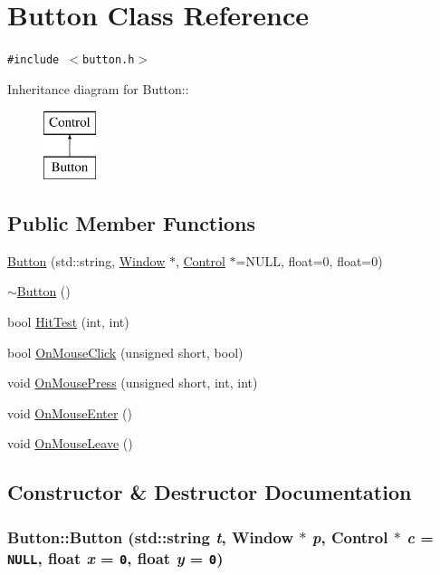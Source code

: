 \hypertarget{class_button}{
\section{Button Class Reference}
\label{class_button}
}
{\tt \#include $<$button.h$>$}

Inheritance diagram for Button::\begin{figure}[H]
\begin{center}
\leavevmode
\includegraphics[height=2cm]{class_button}
\end{center}
\end{figure}
\subsection*{Public Member Functions}
\begin{CompactItemize}
\item 
\hyperlink{class_button_17a0f84e3dfe2f184a8e686a7802b924}{Button} (std::string, \hyperlink{class_window}{Window} $\ast$, \hyperlink{class_control}{Control} $\ast$=NULL, float=0, float=0)
\item 
\hyperlink{class_button_2a001eb9c3cc8ae54768a850dd345002}{$\sim$Button} ()
\item 
bool \hyperlink{class_button_8de2fc8228ff5599b4aaf1ae3db0725f}{HitTest} (int, int)
\item 
bool \hyperlink{class_button_cad3e7ea82ecd98781863ae7ab082ce8}{OnMouseClick} (unsigned short, bool)
\item 
void \hyperlink{class_button_d6b93ae1c85c1dba05424becc7e051f7}{OnMousePress} (unsigned short, int, int)
\item 
void \hyperlink{class_button_69408b048737143eba5ab348e9208405}{OnMouseEnter} ()
\item 
void \hyperlink{class_button_e6593ca8bb94fe3c54a09bf5cf060cf2}{OnMouseLeave} ()
\end{CompactItemize}


\subsection{Constructor \& Destructor Documentation}
\hypertarget{class_button_17a0f84e3dfe2f184a8e686a7802b924}{
\subsubsection[{Button}]{\setlength{\rightskip}{0pt plus 5cm}Button::Button (std::string {\em t}, \/  {\bf Window} $\ast$ {\em p}, \/  {\bf Control} $\ast$ {\em c} = {\tt NULL}, \/  float {\em x} = {\tt 0}, \/  float {\em y} = {\tt 0})}}
\label{class_button_17a0f84e3dfe2f184a8e686a7802b924}


